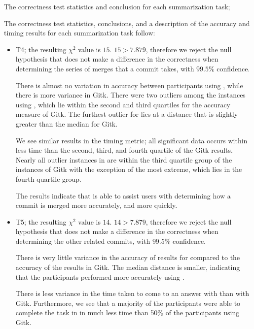 The correctness test statistics and conclusion for each summarization
task;

The correctness test statistics, conclusions, and a description of the
accuracy and timing results for each summarization task follow:

\begin{itemize}

  \item

    T4; the resulting $\chi^2$ value is $15$. $15 > 7.879$, therefore we
    reject the null hypothesis that \tool does not make a difference in
    the correctness when determining the series of merges that a commit
    takes, with $99.5\%$ confidence.

    There is almost no variation in accuracy between participants using
    \tool, while there is more variance in Gitk. There were two outliers
    among the instances using \tool, which lie within the second and
    third quartiles for the accuracy measure of Gitk. The furthest
    outlier for \tool lies at a distance that is slightly greater than
    the median for Gitk.

    We see similar results in the timing metric; all significant data
    occurs within less time than the second, third, and fourth quartile
    of the Gitk results. Nearly all outlier instances in \tool are
    within the third quartile group of the instances of Gitk with the
    exception of the most extreme, which lies in the fourth quartile
    group.

    The results indicate that \tool is able to assist users with
    determining how a commit is merged more accurately, and more
    quickly.

  \item

    T5; the resulting $\chi^2$ value is $14$. $14 > 7.879$, therefore we
    reject the null hypothesis that \tool does not make a difference in
    the correctness when determining the other related commits, with
    $99.5\%$ confidence.

    There is very little variance in the accuracy of results for \tool
    compared to the accuracy of the results in Gitk. The median distance
    is smaller, indicating that the participants performed more
    accurately using \tool.

    There is less variance in the time taken to come to an answer with
    \tool than with Gitk. Furthermore, we see that a majority of the
    participants were able to complete the task in \tool in much less
    time than 50\% of the participants using Gitk.


\end{itemize}
